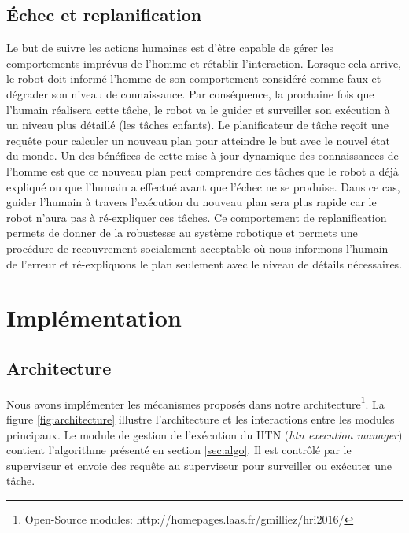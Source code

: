 \documentclass[a4paper,11pt,twoside]{StyleThese}
\begin{document}
\subsection{Échec et replanification}

Le but de suivre les actions humaines est d'être capable de gérer les comportements imprévus de l'homme et rétablir l'interaction. Lorsque cela arrive, le robot doit informé l'homme de son comportement considéré comme faux et dégrader son niveau de connaissance. Par conséquence, la prochaine fois que l'humain réalisera cette tâche, le robot va le guider et surveiller son exécution à un niveau plus détaillé (les tâches enfants).
Le planificateur de tâche reçoit une requête pour calculer un nouveau plan pour atteindre le but avec le nouvel état du monde. 
Un des bénéfices de cette mise à jour dynamique des connaissances de l'homme est que ce nouveau plan peut comprendre des tâches que le robot a déjà expliqué ou que l'humain a effectué avant que l'échec ne se produise. Dans ce cas, guider l'humain à travers l'exécution du nouveau plan sera plus rapide car le robot n'aura pas à ré-expliquer ces tâches.
Ce comportement de replanification permets de donner de la robustesse au système robotique et permets une procédure de recouvrement socialement acceptable où nous informons l'humain de l'erreur et ré-expliquons le plan seulement avec le niveau de détails nécessaires.





\section{Implémentation}
\subsection{Architecture}
Nous avons implémenter les mécanismes proposés dans notre architecture\footnote{Open-Source modules: http://homepages.laas.fr/gmilliez/hri2016/}. La figure \ref{fig:architecture} illustre l'architecture et les interactions entre les modules principaux.
Le module de gestion de l'exécution du HTN (\textit{htn execution manager}) contient l'algorithme présenté en section \ref{sec:algo}.
Il est contrôlé par le superviseur et envoie des requête au superviseur pour surveiller ou exécuter une tâche.
\end{document}
